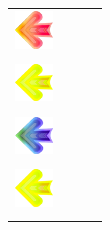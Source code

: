 \begin{center}
\begin{table}[ht]
\begin{minipage}{.5\linewidth}
\begin{tabular}[b]{cccc}
				\includegraphics[width=1cm]{figures/004/left.png}
				  &                                                         
				  &                                                         
				  &                                                         
				\\
				
				  & 

				  &                                                         
				  &                                                         
				\\
				[-27.5pt]
				  \includegraphics[width=1cm]{figures/016/left.png}
                    &

				  & 

				  &                                                         
				\\
				  &                                                         
				  &                                                         
				  & 

				\\
				[-27.5pt]
				\includegraphics[width=1cm]{figures/008/left.png}
				  &                                                         
				  &                                                         
				  &                                                         
				\\
				
				  &

				  &                                                         
				  &                                                         
				\\
				[-27.5pt]
                    \includegraphics[width=1cm]{figures/016/left.png}  
				  &                                                         
				  &        

				  &                                                         
				\\
				[-27.5pt]
				  &                                                         
				  &                                                         
				  &       
			\end{tabular}%
			

\end{minipage}
\end{table}
\end{center}
